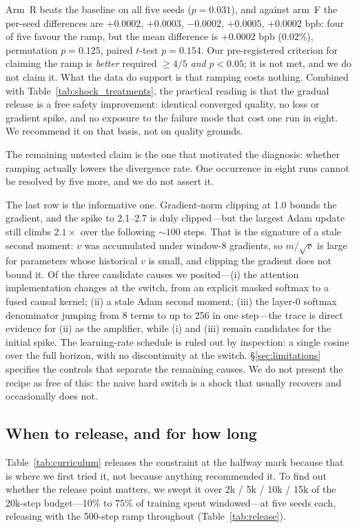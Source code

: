 \documentclass[11pt,a4paper]{article}
\begin{document}
Arm~R beats the baseline on all five seeds ($p = 0.031$), and against arm~F the per-seed differences are $+0.0002$, $+0.0003$, $-0.0002$, $+0.0005$, $+0.0002$ bpb: four of five favour the ramp, but the mean difference is $+0.0002$ bpb ($0.02$\%), permutation $p = 0.125$, paired $t$-test $p = 0.154$. Our pre-registered criterion for claiming the ramp is \emph{better} required $\geq 4/5$ \emph{and} $p<0.05$; it is not met, and we do not claim it. What the data do support is that ramping costs nothing. Combined with Table~\ref{tab:shock_treatments}, the practical reading is that the gradual release is a free safety improvement: identical converged quality, no loss or gradient spike, and no exposure to the failure mode that cost one run in eight. We recommend it on that basis, not on quality grounds.

The remaining untested claim is the one that motivated the diagnosis: whether ramping actually lowers the divergence rate. One occurrence in eight runs cannot be resolved by five more, and we do not assert it.

The last row is the informative one. Gradient-norm clipping at 1.0 bounds the gradient, and the spike to 2.1--2.7 is duly clipped---but the largest Adam update still climbs $2.1\times$ over the following ${\sim}100$ steps. That is the signature of a stale second moment: $v$ was accumulated under window-8 gradients, so $m/\sqrt{v}$ is large for parameters whose historical $v$ is small, and clipping the gradient does not bound it. Of the three candidate causes we posited---(i) the attention implementation changes at the switch, from an explicit masked softmax to a fused causal kernel; (ii) a stale Adam second moment; (iii) the layer-0 softmax denominator jumping from 8 terms to up to 256 in one step---the trace is direct evidence for (ii) as the amplifier, while (i) and (iii) remain candidates for the initial spike. The learning-rate schedule is ruled out by inspection: a single cosine over the full horizon, with no discontinuity at the switch. \S\ref{sec:limitations} specifies the controls that separate the remaining causes. We do not present the recipe as free of this: the naive hard switch is a shock that usually recovers and occasionally does not.

\subsection{When to release, and for how long}
\label{sec:releasepoint}

Table~\ref{tab:curriculum} releases the constraint at the halfway mark because that is where we first tried it, not because anything recommended it. To find out whether the release point matters, we swept it over 2k / 5k / 10k / 15k of the 20k-step budget---10\% to 75\% of training spent windowed---at five seeds each, releasing with the 500-step ramp throughout (Table~\ref{tab:release}).
\end{document}
